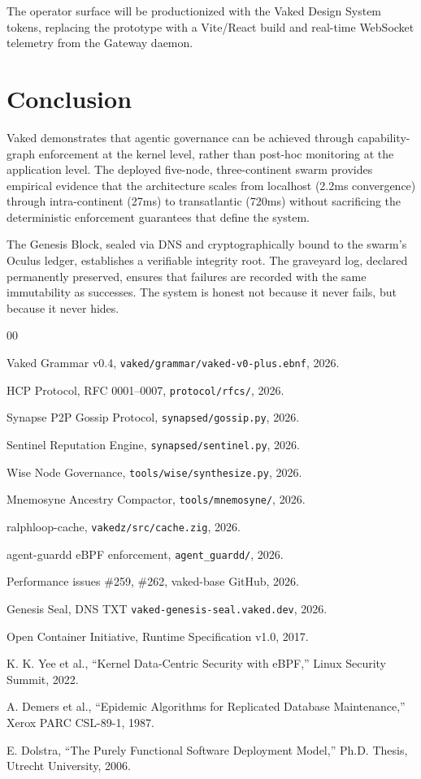 \documentclass[conference]{IEEEtran}
\begin{document}
The operator surface will be productionized with the Vaked Design System
tokens, replacing the prototype with a Vite/React build and real-time
WebSocket telemetry from the Gateway daemon.

\section{Conclusion}

Vaked demonstrates that agentic governance can be achieved through capability-graph
enforcement at the kernel level, rather than post-hoc monitoring at the
application level. The deployed five-node, three-continent swarm provides
empirical evidence that the architecture scales from localhost (2.2ms convergence)
through intra-continent (27ms) to transatlantic (720ms) without sacrificing
the deterministic enforcement guarantees that define the system.

The Genesis Block, sealed via DNS and cryptographically bound to the swarm's
Oculus ledger, establishes a verifiable integrity root. The graveyard log,
declared permanently preserved, ensures that failures are recorded with the
same immutability as successes. The system is honest not because it never
fails, but because it never hides.

\begin{thebibliography}{00}

Vaked Grammar v0.4, \texttt{vaked/grammar/vaked-v0-plus.ebnf}, 2026.

HCP Protocol, RFC 0001--0007, \texttt{protocol/rfcs/}, 2026.

Synapse P2P Gossip Protocol, \texttt{synapsed/gossip.py}, 2026.

Sentinel Reputation Engine, \texttt{synapsed/sentinel.py}, 2026.

Wise Node Governance, \texttt{tools/wise/synthesize.py}, 2026.

Mnemosyne Ancestry Compactor, \texttt{tools/mnemosyne/}, 2026.

ralphloop-cache, \texttt{vakedz/src/cache.zig}, 2026.

agent-guardd eBPF enforcement, \texttt{agent\_guardd/}, 2026.

Performance issues \#259, \#262, vaked-base GitHub, 2026.

Genesis Seal, DNS TXT \texttt{vaked-genesis-seal.vaked.dev}, 2026.

Open Container Initiative, Runtime Specification v1.0, 2017.

K. K. Yee et al., ``Kernel Data-Centric Security with eBPF,''
Linux Security Summit, 2022.

A. Demers et al., ``Epidemic Algorithms for Replicated Database Maintenance,''
Xerox PARC CSL-89-1, 1987.

E. Dolstra, ``The Purely Functional Software Deployment Model,''
Ph.D. Thesis, Utrecht University, 2006.

\end{thebibliography}
\end{document}
